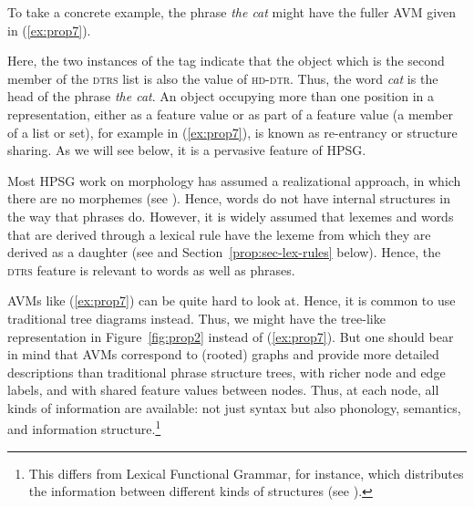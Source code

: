 \documentclass[output=paper
	        ,collection
	        ,collectionchapter
 	        ,biblatex
                ,babelshorthands
                ,newtxmath
                ,draftmode
                ,colorlinks, citecolor=brown
]{langscibook}
\begin{document}
\begin{multicols}{2}
\eal\label{ex:prop6}
\ex\label{ex:prop6a}

\columnbreak
\ex\label{ex:prop6b}
\zl
\end{multicols}
%
To take a concrete example, the phrase \emph{the cat} might have the fuller AVM given in (\ref{ex:prop7}).

\ea\label{ex:prop7}
\z

\noindent
Here, the two instances of the tag  indicate that the  object which is the second member of the \textsc{dtrs} list is also the value of \textsc{hd-dtr}. Thus, the word \emph{cat} is the head of the phrase \emph{the cat}. An object occupying more than one position in a representation, either as a feature value or as part of a feature value (a member of a list or set), for example  in (\ref{ex:prop7}), is known as re-entrancy or structure sharing. As we will see below, it is a pervasive feature of HPSG.

Most HPSG work on morphology has assumed a realizational approach, in which there are no morphemes (see ). Hence, words do not have internal structures in the way that phrases do. However, it is widely assumed that lexemes and words that are derived through a lexical rule have the lexeme from which they are derived as a daughter (see \citealt{BC99a,Meurers2001a} and Section~\ref{prop:sec-lex-rules} below). Hence, the \textsc{dtrs} feature is relevant to words as well as phrases.

AVMs like (\ref{ex:prop7}) can be quite hard to look at. Hence, it is common to use traditional tree
diagrams instead. Thus, we might have the tree-like representation in Figure~\ref{fig:prop2} instead
of (\ref{ex:prop7}). But one should bear in mind that AVMs correspond to (rooted) graphs and provide
more detailed descriptions than traditional phrase structure trees, with richer node and edge
labels, and with shared feature values between nodes. Thus, at each node, all kinds of information
are available: not just syntax but also phonology, semantics, and information structure.\footnote{%
 This differs from Lexical Functional Grammar\indexlfg, for instance, which distributes the
 information between different kinds of structures (see ).}
%
\end{document}
